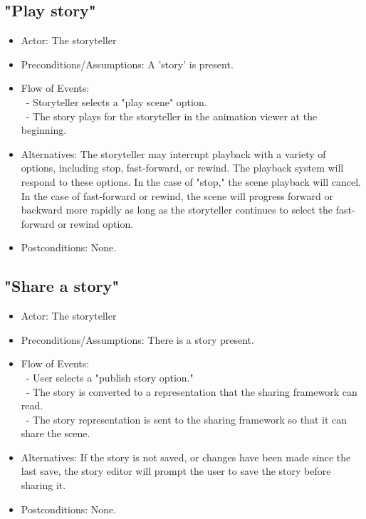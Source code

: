 \documentclass[12pt]{article}
\begin{document}
	\subsection{"Play story"}
\begin{itemize}
	\item Actor: The storyteller
		\item Preconditions/Assumptions: A 'story' is present.
	\item Flow of Events: \\
	\	- Storyteller selects a "play scene" option. \\
	\	- The story plays for the storyteller in the animation viewer at the beginning.
	\item Alternatives: The storyteller may interrupt playback with a variety
	of options, including stop, fast-forward, or rewind. The playback system will respond
	to these options. In the case of "stop," the scene playback will cancel. In the case of
	fast-forward or rewind, the scene will progress forward or backward more rapidly as long
	as the storyteller continues to select the fast-forward or rewind option.
	\item Postconditions: None.	
\end{itemize}

		\subsection{"Share a story"}
\begin{itemize}
	\item Actor: The storyteller
		\item Preconditions/Assumptions: There is a story present.
	\item Flow of Events: \\
	\	- User selects a "publish story option." \\
	\	- The story is converted to a representation that the sharing framework can read. \\
	\	- The story representation is sent to the sharing framework so that it can share the scene.
	\item Alternatives: If the story is not saved, or changes have been made since the last save,
	the story editor will prompt the user to save the story before sharing it.
	\item Postconditions: None.
\end{itemize}

\end{document}
